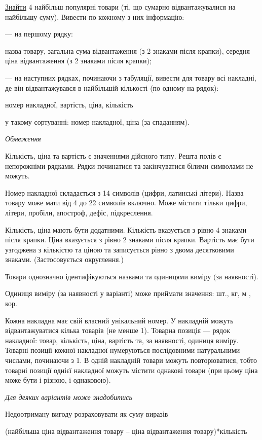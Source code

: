 \documentclass[11pt, ukrainian]{article}
\begin{document}
\underline{Знайти} 4 найбільш популярні товари (ті, що сумарно відвантажувалися на найбільшу суму). Вивести по кожному з них інформацію:\par
{\noindent}--- на першому рядку:\par
назва товару, загальна сума відвантаження (з 2 знаками після крапки), середня ціна відвантаження (з 2 знаками після крапки);

{\noindent}--- на наступних рядках, починаючи з табуляції, вивести для товару всі накладні, де він відвантажувався в найбільшій кількості (по одному на рядок):\par
номер накладної, вартість, ціна, кількість

{\noindent}у такому сортуванні: номер накладної, ціна (за спаданням).


\bigskip\textit{Обмеження}

Кількість, ціна та вартість є значеннями дійсного типу.
Решта полів є непорожніми рядками.
Рядки починатися та закінчуватися білими символами не можуть.

Номер накладної складається з 14 символів (цифри, латинські літери).
Назва товару може мати від 4 до 22 символів включно.
Може містити тільки цифри, літери, пробіли, апостроф, дефіс, підкреслення.

Кількість, ціна мають бути додатними.
Кількість вказується з рівно 4 знаками після крапки.
Ціна вказується з рівно 2 знаками після крапки.
Вартість має бути узгоджена з кількістю та ціною та записується рівно з двома десятковими знаками.
(Застосовується округлення.)

Товари однозначно ідентифікуються назвами та одиницями виміру (за наявності).

Одиниця виміру (за наявності у варіанті) може приймати значення: шт., кг, м , кор.

Кожна накладна має свій власний унікальний номер.
У накладній можуть відвантажуватися кілька товарів (не менше 1).
Товарна позиція --- рядок накладної: товар, кількість, ціна, вартість та, за наявності, одиниця виміру.
Товарні позиції кожної накладної нумеруються послідовними натуральними числами, починаючи з 1.
В одній накладній товари можуть повторюватися, 
тобто товарні позиції однієї накладної можуть містити однакові товари 
(при цьому ціна може бути і різною, і однаковою).

\bigskip\textit{Для деяких варіантів може знадобитись}

Недоотриману вигоду розраховувати як суму виразів
{\center (найбільша ціна відвантаження товару – ціна відвантаження товару)*кількість\par}
\end{document}
